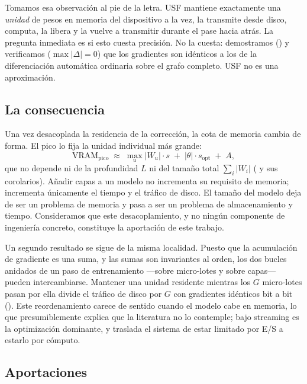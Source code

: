 \documentclass[journal]{IEEEtran}
\newcommand{\usf}{USF}
\newcommand{\Wu}{\lvert W_u \rvert}
\begin{document}
Tomamos esa observación al pie de la letra. \usf{} mantiene exactamente una \emph{unidad} de pesos
en memoria del dispositivo a la vez, la transmite desde disco, computa, la libera y la vuelve a
transmitir durante el pase hacia atrás. La pregunta inmediata es si esto cuesta precisión. No la
cuesta: demostramos () y verificamos ($\max|\Delta|=0$) que los gradientes son
idénticos a los de la diferenciación automática ordinaria sobre el grafo completo. \usf{} no es una
aproximación.

\subsection{La consecuencia}

Una vez desacoplada la residencia de la corrección, la cota de memoria cambia de forma. El pico lo
fija la unidad individual más grande:
\begin{equation}
\label{eq:headline}
\mathrm{VRAM}_{\text{pico}} \;\approx\; \max_u \Wu \cdot s \;+\; |\theta|\cdot s_{\text{opt}} \;+\; A ,
\end{equation}
que no depende ni de la profundidad $L$ ni del tamaño total $\sum_i |W_i|$ ( y sus
corolarios). Añadir capas a un modelo no incrementa su requisito de memoria; incrementa únicamente
el tiempo y el tráfico de disco. El tamaño del modelo deja de ser un problema de memoria y pasa a
ser un problema de almacenamiento y tiempo. Consideramos que este desacoplamiento, y no ningún
componente de ingeniería concreto, constituye la aportación de este trabajo.

Un segundo resultado se sigue de la misma localidad. Puesto que la acumulación de gradiente es una
suma, y las sumas son invariantes al orden, los dos bucles anidados de un paso de entrenamiento
---sobre micro-lotes y sobre capas--- pueden intercambiarse. Mantener una unidad residente mientras
los $G$ micro-lotes pasan por ella divide el tráfico de disco por $G$ con gradientes idénticos bit
a bit (). Este reordenamiento carece de sentido cuando el modelo cabe en memoria, lo
que presumiblemente explica que la literatura no lo contemple; bajo streaming es la optimización
dominante, y traslada el sistema de estar limitado por E/S a estarlo por cómputo.

\subsection{Aportaciones}
\end{document}
